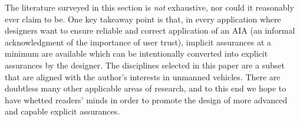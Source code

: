 The literature surveyed in this section is \emph{not} exhaustive, nor could it reasonably ever claim to be. One key takeaway point is that, in every application where designers want to ensure reliable and correct application of an AIA (an informal acknowledgment of the importance of user trust), implicit assurances at a minimum are available which can be intentionally converted into explicit assurances by the designer. 
The disciplines selected in this paper are a subset that are aligned with the author's interests in unmanned vehicles. There are doubtless many other applicable areas of research, and to this end we hope to have whetted readers' minds in order to promote the design of more advanced and capable explicit assurances.
